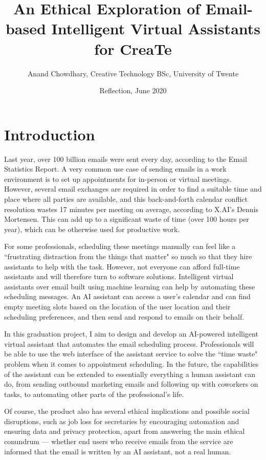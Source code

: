 \documentclass{article}
\title{An Ethical Exploration of Email-based Intelligent Virtual Assistants for CreaTe}
\date{Reflection, June 2020}
\author{Anand Chowdhary, Creative Technology BSc, University of Twente}
\begin{document}
  \maketitle
  \tableofcontents
  \newpage

\section{Introduction}

Last year, over 100 billion emails were sent every day, according to the Email Statistics Report. A very common use case of sending emails in a work environment is to set up appointments for in-person or virtual meetings. However, several email exchanges are required in order to find a suitable time and place where all parties are available, and this back-and-forth calendar conflict resolution wastes 17 minutes per meeting on average, according to X.AI's Dennis Mortensen. This can add up to a significant waste of time (over 100 hours per year), which can be otherwise used for productive work.

For some professionals, scheduling these meetings manually can feel like a ``frustrating distraction from the things that matter" \cite{cranshaw_calendar.help:_2017} so much so that they hire assistants to help with the task. However, not everyone can afford full-time assistants and will therefore turn to software solutions. Intelligent virtual assistants over email built using machine learning can help by automating these scheduling messages. An AI assistant can access a user's calendar and can find empty meeting slots based on the location of the user location and their scheduling preferences, and then send and respond to emails on their behalf.

In this graduation project, I aim to design and develop an AI-powered intelligent virtual assistant that automates the email scheduling process. Professionals will be able to use the web interface of the assistant service to solve the ``time waste" problem when it comes to appointment scheduling. In the future, the capabilities of the assistant can be extended to essentially everything a human assistant can do, from sending outbound marketing emails and following up with coworkers on tasks, to automating other parts of the professional's life.

Of course, the product also has several ethical implications and possible social disruptions, such as job loss for secretaries by encouraging automation and ensuring data and privacy protection, apart from answering the main ethical conundrum — whether end users who receive emails from the service are informed that the email is written by an AI assistant, not a real human.
\end{document}
